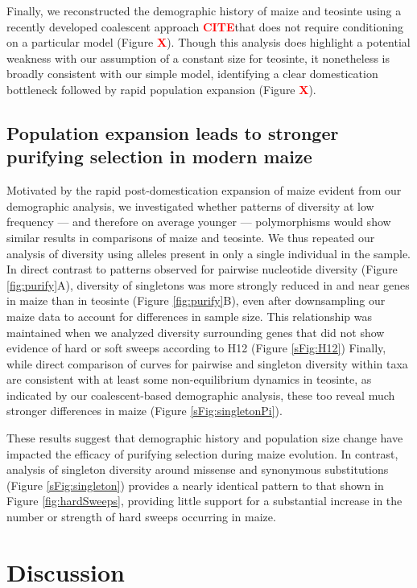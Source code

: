 \documentclass{pnastwo}
\newcommand{\citex}{\textcolor{red}{\bf CITE}}
\newcommand{\X}{\textcolor{red}{\bf X}}
\begin{document}
\begin{article}
\color{blue}
Finally, we reconstructed the demographic history of maize and teosinte using a recently developed coalescent approach \citex that does not require conditioning on a particular model (Figure \X).
Though this analysis does highlight a potential weakness with our assumption of a constant size for teosinte, it nonetheless is broadly consistent with our simple model,   identifying a clear domestication bottleneck followed by rapid population expansion (Figure \X). 
\color{black}

\subsection{Population expansion leads to stronger purifying selection in modern maize}
Motivated by the rapid post-domestication expansion of maize evident from our demographic analysis, we investigated whether patterns of diversity at low frequency --- and therefore on average younger --- polymorphisms would show similar results in comparisons of maize and teosinte.
We thus repeated our analysis of diversity using alleles present in only a single individual in the sample.
In direct contrast to patterns observed for pairwise nucleotide diversity (Figure \ref{fig:purify}A), diversity of singletons was more strongly reduced in and near genes in maize than in teosinte (Figure \ref{fig:purify}B), even after downsampling our maize data to account for differences in sample size. This relationship was maintained when we analyzed diversity surrounding genes that did not show evidence of hard or soft sweeps according to H12 (Figure \ref{sFig:H12})
Finally, while direct comparison of curves for pairwise and singleton diversity within taxa are consistent with at least some non-equilibrium dynamics in teosinte, as indicated by our coalescent-based demographic analysis, these too reveal much stronger differences in maize (Figure \ref{sFig:singletonPi}). 

These results suggest that demographic history and population size change have impacted the efficacy of purifying selection during maize evolution.
In contrast, analysis of singleton diversity around missense and synonymous substitutions (Figure \ref{sFig:singleton}) provides a nearly identical pattern to that shown in Figure \ref{fig:hardSweeps}, providing little support for a substantial increase in the number or strength of hard sweeps occurring in maize.  

\section{Discussion}


\end{article}
\end{document}
